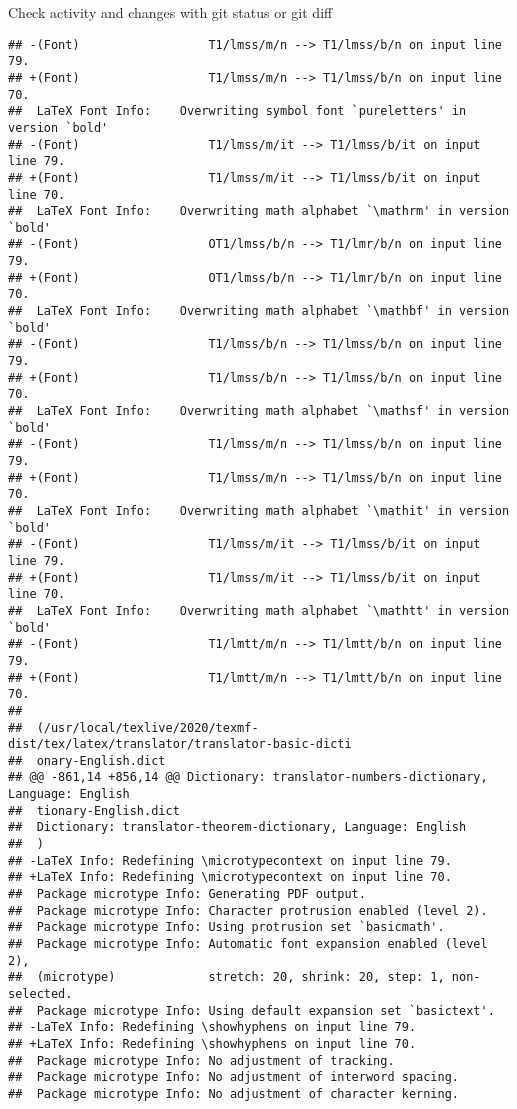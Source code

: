 \documentclass[ignorenonframetext,]{beamer}
\begin{document}
\begin{frame}[fragile]{Check activity and changes with git status or git
diff}
\begin{verbatim}
## -(Font)                  T1/lmss/m/n --> T1/lmss/b/n on input line 79.
## +(Font)                  T1/lmss/m/n --> T1/lmss/b/n on input line 70.
##  LaTeX Font Info:    Overwriting symbol font `pureletters' in version `bold'
## -(Font)                  T1/lmss/m/it --> T1/lmss/b/it on input line 79.
## +(Font)                  T1/lmss/m/it --> T1/lmss/b/it on input line 70.
##  LaTeX Font Info:    Overwriting math alphabet `\mathrm' in version `bold'
## -(Font)                  OT1/lmss/b/n --> T1/lmr/b/n on input line 79.
## +(Font)                  OT1/lmss/b/n --> T1/lmr/b/n on input line 70.
##  LaTeX Font Info:    Overwriting math alphabet `\mathbf' in version `bold'
## -(Font)                  T1/lmss/b/n --> T1/lmss/b/n on input line 79.
## +(Font)                  T1/lmss/b/n --> T1/lmss/b/n on input line 70.
##  LaTeX Font Info:    Overwriting math alphabet `\mathsf' in version `bold'
## -(Font)                  T1/lmss/m/n --> T1/lmss/b/n on input line 79.
## +(Font)                  T1/lmss/m/n --> T1/lmss/b/n on input line 70.
##  LaTeX Font Info:    Overwriting math alphabet `\mathit' in version `bold'
## -(Font)                  T1/lmss/m/it --> T1/lmss/b/it on input line 79.
## +(Font)                  T1/lmss/m/it --> T1/lmss/b/it on input line 70.
##  LaTeX Font Info:    Overwriting math alphabet `\mathtt' in version `bold'
## -(Font)                  T1/lmtt/m/n --> T1/lmtt/b/n on input line 79.
## +(Font)                  T1/lmtt/m/n --> T1/lmtt/b/n on input line 70.
##  
##  (/usr/local/texlive/2020/texmf-dist/tex/latex/translator/translator-basic-dicti
##  onary-English.dict
## @@ -861,14 +856,14 @@ Dictionary: translator-numbers-dictionary, Language: English
##  tionary-English.dict
##  Dictionary: translator-theorem-dictionary, Language: English 
##  )
## -LaTeX Info: Redefining \microtypecontext on input line 79.
## +LaTeX Info: Redefining \microtypecontext on input line 70.
##  Package microtype Info: Generating PDF output.
##  Package microtype Info: Character protrusion enabled (level 2).
##  Package microtype Info: Using protrusion set `basicmath'.
##  Package microtype Info: Automatic font expansion enabled (level 2),
##  (microtype)             stretch: 20, shrink: 20, step: 1, non-selected.
##  Package microtype Info: Using default expansion set `basictext'.
## -LaTeX Info: Redefining \showhyphens on input line 79.
## +LaTeX Info: Redefining \showhyphens on input line 70.
##  Package microtype Info: No adjustment of tracking.
##  Package microtype Info: No adjustment of interword spacing.
##  Package microtype Info: No adjustment of character kerning.

\end{verbatim}
\end{frame}
\end{document}
